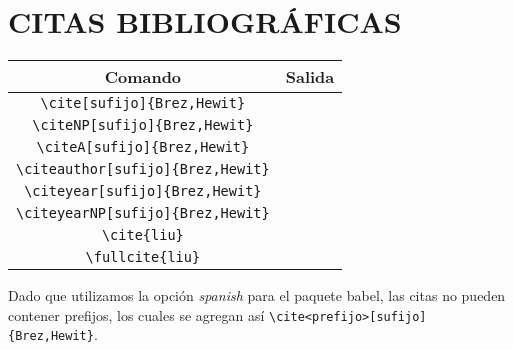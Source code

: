 \chapter{CITAS BIBLIOGRÁFICAS}

\begin{center}
	\begin{tabular}{c|c}
		\hline
		Comando	& Salida  \\
		\hline
		\verb|\cite[sufijo]{Brez,Hewit}| & \cite[sufijo]{Brez,Hewit} \\
		\hline
		\verb|\citeNP[sufijo]{Brez,Hewit}| & \citeNP[sufijo]{Brez,Hewit} \\
		\hline
		\verb|\citeA[sufijo]{Brez,Hewit}| & \citeA[sufijo]{Brez,Hewit} \\
		\hline
		\verb|\citeauthor[sufijo]{Brez,Hewit}| & \citeauthor[sufijo]{Brez,Hewit} \\
		\hline
		\verb|\citeyear[sufijo]{Brez,Hewit}| & \citeyear[sufijo]{Brez,Hewit} \\
		\hline
		\verb|\citeyearNP[sufijo]{Brez,Hewit}| & \citeyearNP[sufijo]{Brez,Hewit} \\
		\hline
		\verb|\cite{liu}| & \cite{liu} \\ \hline
		\verb|\fullcite{liu}| & \fullcite{liu} \\ \hline
	\end{tabular}
\end{center} Dado que utilizamos la opción \textit{spanish} para el paquete \textsf{babel}, las citas no pueden contener prefijos, los cuales se agregan así \verb|\cite<prefijo>[sufijo]{Brez,Hewit}|.